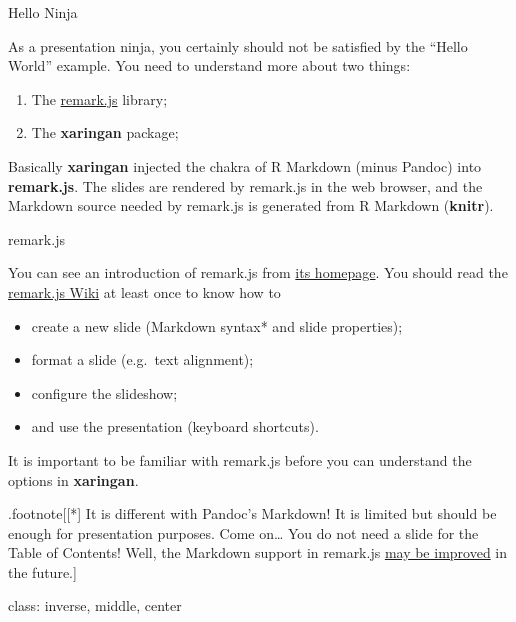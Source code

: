 \documentclass[ignorenonframetext,]{beamer}
\begin{document}
\begin{frame}{Hello Ninja}
\protect\hypertarget{hello-ninja}{}

As a presentation ninja, you certainly should not be satisfied by the
``Hello World'' example. You need to understand more about two things:

\begin{enumerate}
\item
  The \href{https://remarkjs.com}{remark.js} library;
\item
  The \textbf{xaringan} package;
\end{enumerate}

Basically \textbf{xaringan} injected the chakra of R Markdown (minus
Pandoc) into \textbf{remark.js}. The slides are rendered by remark.js in
the web browser, and the Markdown source needed by remark.js is
generated from R Markdown (\textbf{knitr}).

\end{frame}

\begin{frame}{remark.js}
\protect\hypertarget{remark.js}{}

You can see an introduction of remark.js from
\href{https://remarkjs.com}{its homepage}. You should read the
\href{https://github.com/gnab/remark/wiki}{remark.js Wiki} at least once
to know how to

\begin{itemize}
\item
  create a new slide (Markdown syntax* and slide properties);
\item
  format a slide (e.g.~text alignment);
\item
  configure the slideshow;
\item
  and use the presentation (keyboard shortcuts).
\end{itemize}

It is important to be familiar with remark.js before you can understand
the options in \textbf{xaringan}.

.footnote{[}{[}*{]} It is different with Pandoc's Markdown! It is
limited but should be enough for presentation purposes. Come on\ldots{}
You do not need a slide for the Table of Contents! Well, the Markdown
support in remark.js
\href{https://github.com/gnab/remark/issues/142}{may be improved} in the
future.{]}

class: inverse, middle, center

\end{frame}
\end{document}

